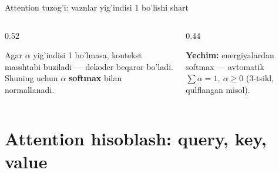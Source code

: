 \documentclass[aspectratio=169,11pt]{beamer}
\begin{document}
\begin{frame}{Attention tuzog'i: vaznlar yig'indisi 1 bo'lishi shart}
  \begin{columns}[T]
    \begin{column}{0.52\textwidth}
      \begin{tcolorbox}[warnbox,title=Normallanmagan vaznlar]
        \small
        Agar $\alpha$ yig'indisi 1 bo'lmasa, kontekst masshtabi buziladi ---
        dekoder beqaror bo'ladi. Shuning uchun $\alpha$ \textbf{softmax} bilan
        normallanadi.
      \end{tcolorbox}
    \end{column}
    \begin{column}{0.44\textwidth}
      \begin{tcolorbox}[okbox,top=2pt,bottom=2pt]
        \footnotesize
        \textbf{Yechim:} energiyalardan softmax --- avtomatik
        $\sum\alpha=1,\ \alpha\ge 0$ (3-tsikl, qulflangan misol).
      \end{tcolorbox}
    \end{column}
  \end{columns}
\end{frame}

\section[Q/K/V]{Attention hisoblash: query, key, value}
\end{document}
